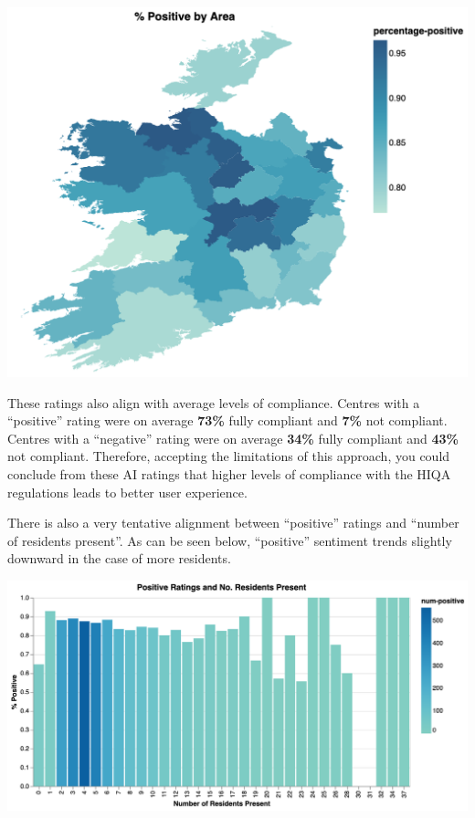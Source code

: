 \documentclass[a4paper,11pt,twoside]{article}
\begin{document}
\begin{center}
\includegraphics[width=.9\linewidth]{img/16_rating_area.png}
\end{center}

These ratings also align with average levels of compliance. Centres with a ``positive'' rating were on average \textbf{73\%} fully compliant and \textbf{7\%} not compliant. Centres with a ``negative'' rating were on average \textbf{34\%} fully compliant and \textbf{43\%} not compliant. Therefore, accepting the limitations of this approach, you could conclude from these AI ratings that higher levels of compliance with the HIQA regulations leads to better user experience.

There is also a very tentative alignment between ``positive'' ratings and ``number of residents present''. As can be seen below, ``positive'' sentiment trends slightly downward in the case of more residents.

\begin{center}
\includegraphics[width=.9\linewidth]{img/17_rating_residents_pos.png}
\end{center}
\end{document}

